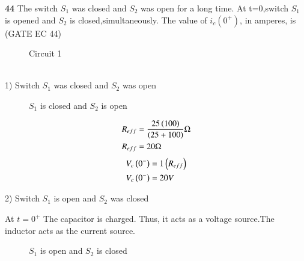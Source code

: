 \documentclass[journal,12pt,twocolumn]{IEEEtran}
\begin{document}


\vspace{3cm}

\title{}
\author{EE23BTECH11047 - Deepakreddy P
}
\maketitle
\newpage
\bigskip

\noindent \textbf{44} \quad The switch $S_1$ was closed and $S_2$ was open for a long time. At t=0,switch $S_1$ is opened and $S_2$ is closed,simultaneously. The value of $i_c(0^{+})$, in amperes, is  \hfill (GATE EC 44)

\begin{figure}[ht]
  \centering
  \begin{adjustbox}{width=\columnwidth}
      
  \end{adjustbox}
  \caption{Circuit 1}
\end{figure}

\solution
\\
1) Switch $S_1$ was closed and $S_2$ was open 
\begin{figure}[ht]
  \centering
  \begin{adjustbox}{width=\columnwidth}
      
  \end{adjustbox}
  \caption{$S_1$ is closed and $S_2$ is open}
\end{figure}

\begin{align}
    R_{eff} &= \frac{25\left(100\right)}{\left(25+100\right)} \Omega \\
    R_{eff} &= 20 \Omega 
\end{align}
\begin{align}
    V_c \left(0^-\right) &= 1 \left(R_{eff}\right)\\
    V_c \left(0^-\right) &= 20V
\end{align}

\bigskip

2) Switch $S_1$ is open and $S_2$ was closed\\

\bigskip

At $t=0^{+}$ The capacitor is charged. Thus, it acts as a voltage source.The inductor acts as the current source.

\bigskip

\begin{figure}[ht]
  \centering
  \begin{adjustbox}{width=\columnwidth}
      
  \end{adjustbox}
  \caption{$S_1$ is open and $S_2$ is closed}
\end{figure}
\end{document}
